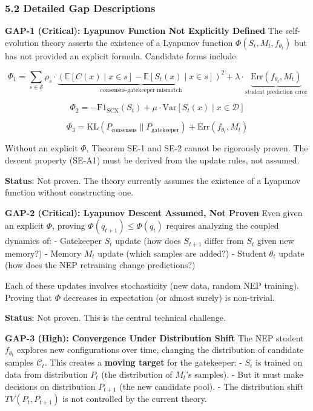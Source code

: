 \documentclass[
  12pt,
]{ctexart}
\begin{document}
\subsubsection{5.2 Detailed Gap
Descriptions}\label{detailed-gap-descriptions}

\textbf{GAP-1 (Critical): Lyapunov Function Not Explicitly Defined} The
self-evolution theory asserts the existence of a Lyapunov function
\(\Phi(S_t, M_t, f_{\theta_t})\) but has not provided an explicit
formula. Candidate forms include:

\[\Phi_1 = \sum_{s \in \mathcal{S}} \rho_s \cdot \underbrace{(\mathbb{E}[C(x) \mid x \in s] - \mathbb{E}[S_t(x) \mid x \in s])^2}_{\text{consensus-gatekeeper mismatch}} + \lambda \cdot \underbrace{\text{Err}(f_{\theta_t}, M_t)}_{\text{student prediction error}}\]

\[\Phi_2 = -\text{F1}_{\text{SCX}}(S_t) + \mu \cdot \text{Var}[S_t(x) \mid x \in \mathcal{D}]\]

\[\Phi_3 = \text{KL}(P_{\text{consensus}} \| P_{\text{gatekeeper}}) + \text{Err}(f_{\theta_t}, M_t)\]

Without an explicit \(\Phi\), Theorem SE-1 and SE-2 cannot be rigorously
proven. The descent property (SE-A1) must be derived from the update
rules, not assumed.

\textbf{Status}: Not proven. The theory currently assumes the existence
of a Lyapunov function without constructing one.

\textbf{GAP-2 (Critical): Lyapunov Descent Assumed, Not Proven} Even
given an explicit \(\Phi\), proving \(\Phi(q_{t+1}) \leq \Phi(q_t)\)
requires analyzing the coupled dynamics of: - Gatekeeper \(S_t\) update
(how does \(S_{t+1}\) differ from \(S_t\) given new memory?) - Memory
\(M_t\) update (which samples are added?) - Student \(\theta_t\) update
(how does the NEP retraining change predictions?)

Each of these updates involves stochasticity (new data, random NEP
training). Proving that \(\Phi\) decreases in expectation (or almost
surely) is non-trivial.

\textbf{Status}: Not proven. This is the central technical challenge.

\textbf{GAP-3 (High): Convergence Under Distribution Shift} The NEP
student \(f_{\theta_t}\) explores new configurations over time, changing
the distribution of candidate samples \(\mathcal{C}_t\). This creates a
\textbf{moving target} for the gatekeeper: - \(S_t\) is trained on data
from distribution \(P_t\) (the distribution of \(M_t\)'s samples). - But
it must make decisions on distribution \(P_{t+1}\) (the new candidate
pool). - The distribution shift \(TV(P_t, P_{t+1})\) is not controlled
by the current theory.
\end{document}
